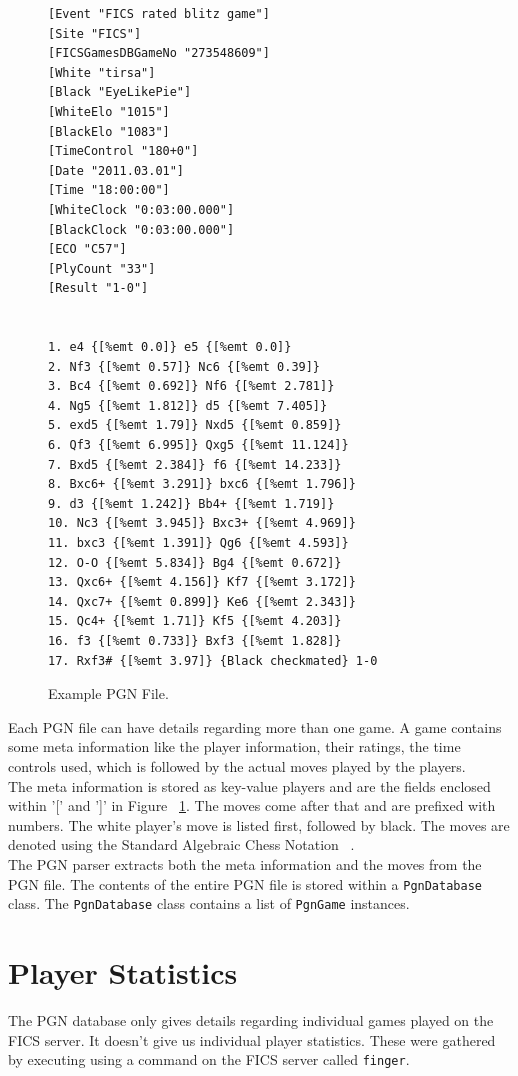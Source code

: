 \documentclass{article}
\begin{document}
\begin{figure}[tph]
\begin{center}
\begin{verbatim}
[Event "FICS rated blitz game"]
[Site "FICS"]
[FICSGamesDBGameNo "273548609"]
[White "tirsa"]
[Black "EyeLikePie"]
[WhiteElo "1015"]
[BlackElo "1083"]
[TimeControl "180+0"]
[Date "2011.03.01"]
[Time "18:00:00"]
[WhiteClock "0:03:00.000"]
[BlackClock "0:03:00.000"]
[ECO "C57"]
[PlyCount "33"]
[Result "1-0"]


1. e4 {[%emt 0.0]} e5 {[%emt 0.0]} 
2. Nf3 {[%emt 0.57]} Nc6 {[%emt 0.39]} 
3. Bc4 {[%emt 0.692]} Nf6 {[%emt 2.781]} 
4. Ng5 {[%emt 1.812]} d5 {[%emt 7.405]} 
5. exd5 {[%emt 1.79]} Nxd5 {[%emt 0.859]} 
6. Qf3 {[%emt 6.995]} Qxg5 {[%emt 11.124]} 
7. Bxd5 {[%emt 2.384]} f6 {[%emt 14.233]} 
8. Bxc6+ {[%emt 3.291]} bxc6 {[%emt 1.796]} 
9. d3 {[%emt 1.242]} Bb4+ {[%emt 1.719]} 
10. Nc3 {[%emt 3.945]} Bxc3+ {[%emt 4.969]} 
11. bxc3 {[%emt 1.391]} Qg6 {[%emt 4.593]} 
12. O-O {[%emt 5.834]} Bg4 {[%emt 0.672]} 
13. Qxc6+ {[%emt 4.156]} Kf7 {[%emt 3.172]} 
14. Qxc7+ {[%emt 0.899]} Ke6 {[%emt 2.343]} 
15. Qc4+ {[%emt 1.71]} Kf5 {[%emt 4.203]} 
16. f3 {[%emt 0.733]} Bxf3 {[%emt 1.828]} 
17. Rxf3# {[%emt 3.97]} {Black checkmated} 1-0

\end{verbatim}
\end{center}
\caption{Example PGN File.}
\label{fig:pgn}
\end{figure}

Each PGN file can have details regarding more than one game. A game contains some meta information like the player information, their ratings, the time controls used, which is followed by the actual moves played by the players.\\

The meta information is stored as key-value players and are the fields enclosed within '[' and ']' in Figure ~\ref{fig:pgn}. The moves come after that and are prefixed with numbers. The white player's move is listed first, followed by black. The moves are denoted using the Standard Algebraic Chess Notation ~\cite{wiki:san}. \\

The PGN parser extracts both the meta information and the moves from the PGN file. The contents of the entire PGN file is stored within a \verb=PgnDatabase= class. The \verb=PgnDatabase= class contains a list of \verb=PgnGame= instances.

\section{Player Statistics}
\label{sec:pstats}
The PGN database only gives details regarding individual games played on the FICS server. It doesn't give us individual player statistics. These were gathered by executing using a command on the FICS server called \verb=finger=. 
\end{document}
